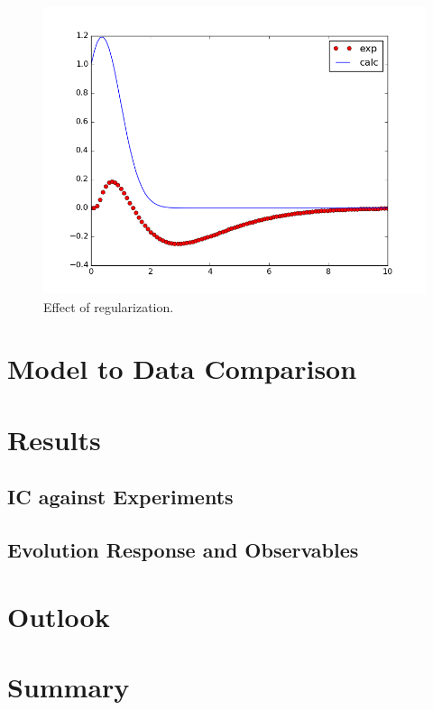 \documentclass[10pt,a4paper, twocolumn]{article}
\begin{document}
	\begin{figure}[htbp]
		\includegraphics[width = \columnwidth]{./pics/place_holder.png}
	\caption{Effect of regularization.}
	\label{regularization}
	\end{figure}

\section{Model to Data Comparison}
	
\section{Results}
	\subsection{IC against Experiments}
	\subsection{Evolution Response and Observables}
\section{Outlook}

\section{Summary}
\end{document}
